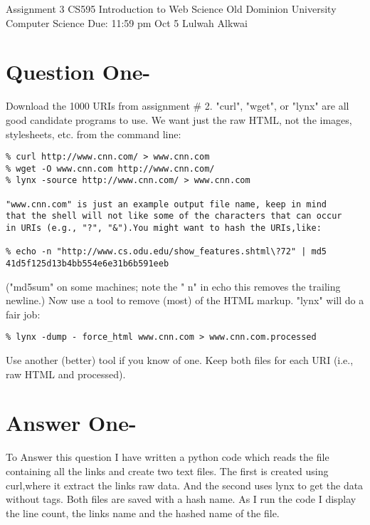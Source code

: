 \documentclass[letterpaper,11pt]{article}
\begin{document}
\begin{titlepage}
\begin{center}


\Huge{Assignment 3}
\newline
\Large{CS595}
\newline
\Large{Introduction to Web Science}
\newline
\Large{Old Dominion University}
\newline
\Large{Computer Science}
\newline
\Large{Due: 11:59 pm Oct 5}
\newline
\Large{Lulwah Alkwai}
\newline
\end{center}
\end{titlepage}
\newpage


\section*{ Question One-}

Download the 1000 URIs from assignment \# 2.  "curl", "wget", or
"lynx" are all good candidate programs to use.  We want just the
raw HTML, not the images, stylesheets, etc.
from the command line:

\begin{verbatim}
% curl http://www.cnn.com/ > www.cnn.com
% wget -O www.cnn.com http://www.cnn.com/
% lynx -source http://www.cnn.com/ > www.cnn.com

"www.cnn.com" is just an example output file name, keep in mind
that the shell will not like some of the characters that can occur
in URIs (e.g., "?", "&").You might want to hash the URIs,like:

% echo -n "http://www.cs.odu.edu/show_features.shtml\?72" | md5
41d5f125d13b4bb554e6e31b6b591eeb
\end{verbatim}

("md5sum" on some machines; note the "\- n" in echo \-\- this removes
the trailing newline.) Now use a tool to remove (most) of the HTML markup.  "lynx" will
do a fair job:

\begin{verbatim}
% lynx -dump - force_html www.cnn.com > www.cnn.com.processed
\end{verbatim}

Use another (better) tool if you know of one.  Keep both files 
for each URI (i.e., raw HTML and processed). 
\pagebreak

\section*{Answer One-}
To Answer this question I have written a python code which reads the file containing all the links and create two text files. The first is created using curl,where it extract the links raw data. And the second uses lynx to get the data without tags. Both files are saved with a hash name.
As I run the code I display the line count, the links name and the hashed name of the file.\\
\end{document}
